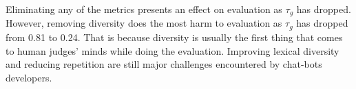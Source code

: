 Eliminating any of the metrics presents an effect on evaluation as $\tau_g$ has dropped.
However, removing diversity does the most harm to evaluation as $\tau_g$ has dropped from 0.81 to 0.24. 
That is because diversity is usually the first thing that comes to human judges' minds while doing the evaluation. 
Improving lexical diversity and reducing repetition are still major
challenges encountered by chat-bots developers.



